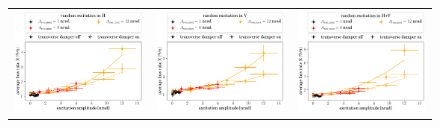\documentclass[aps
,prstab
,reprint
,longbibliography
,preprintnumbers
,showkeys
,amsfonts,amssymb,amsmath
,floatfix
]{revtex4-1}
\newlength{\thirdwidth}
\begin{document}
\begin{figure}
  \begin{tabular}{ccc}
  \includegraphics[width=\thirdwidth]{2017_scale_amp_ranh_lblshort.png} &
  \includegraphics[width=\thirdwidth]{2017_scale_amp_ranv_lblshort.png} &
  \includegraphics[width=\thirdwidth]{2017_scale_amp_ranhv_lblshort.png} \\

\end{tabular}
\end{figure}
\end{document}
